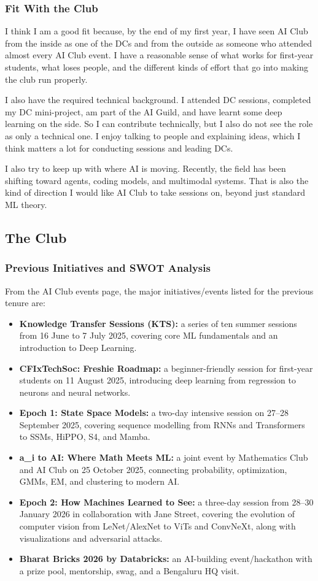 \documentclass[11pt,a4paper]{article}
\begin{document}
\subsubsection{Fit With the Club}
I think I am a good fit because, by the end of my first year, I have seen AI Club from the inside as one of the DCs and from the outside as someone who attended almost every AI Club event. I have a reasonable sense of what works for first-year students, what loses people, and the different kinds of effort that go into making the club run properly.

I also have the required technical background. I attended DC sessions, completed my DC mini-project, am part of the AI Guild, and have learnt some deep learning on the side. So I can contribute technically, but I also do not see the role as only a technical one. I enjoy talking to people and explaining ideas, which I think matters a lot for conducting sessions and leading DCs.

I also try to keep up with where AI is moving. Recently, the field has been shifting toward agents, coding models, and multimodal systems. That is also the kind of direction I would like AI Club to take sessions on, beyond just standard ML theory.

\subsection{The Club}

\subsubsection{Previous Initiatives and SWOT Analysis}
From the AI Club events page, the major initiatives/events listed for the previous tenure are:
\begin{itemize}
    \item \textbf{Knowledge Transfer Sessions (KTS):} a series of ten summer sessions from 16 June to 7 July 2025, covering core ML fundamentals and an introduction to Deep Learning.
    \item \textbf{CFIxTechSoc: Freshie Roadmap:} a beginner-friendly session for first-year students on 11 August 2025, introducing deep learning from regression to neurons and neural networks.
    \item \textbf{Epoch 1: State Space Models:} a two-day intensive session on 27--28 September 2025, covering sequence modelling from RNNs and Transformers to SSMs, HiPPO, S4, and Mamba.
    \item \textbf{a\_i to AI: Where Math Meets ML:} a joint event by Mathematics Club and AI Club on 25 October 2025, connecting probability, optimization, GMMs, EM, and clustering to modern AI.
    \item \textbf{Epoch 2: How Machines Learned to See:} a three-day session from 28--30 January 2026 in collaboration with Jane Street, covering the evolution of computer vision from LeNet/AlexNet to ViTs and ConvNeXt, along with visualizations and adversarial attacks.
    \item \textbf{Bharat Bricks 2026 by Databricks:} an AI-building event/hackathon with a prize pool, mentorship, swag, and a Bengaluru HQ visit.
\end{itemize}
\end{document}

